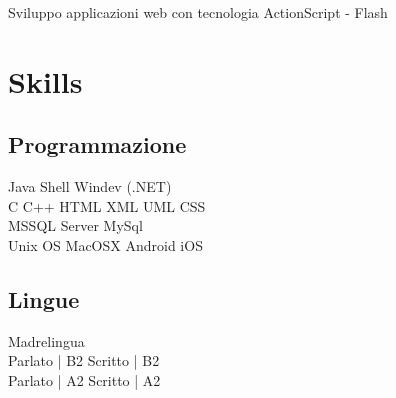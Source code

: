 \documentclass[a4paper]{deedy-resume} %
\begin{document}
\begin{minipage}[t]{0.66\textwidth}
\sectionspace %




\begin{tightitemize}
\item Sviluppo applicazioni web con tecnologia ActionScript - Flash
\end{tightitemize}

\sectionspace %



\section{Skills}

\subsection{Programmazione}

Java \textbullet{} Shell \textbullet{} Windev (.NET) \\
C \textbullet{} C++ \textbullet{} HTML \textbullet{} XML \textbullet{} UML\textbullet{} CSS\\
MSSQL Server \textbullet{} MySql \\
Unix OS \textbullet{} MacOSX \textbullet{} Android \textbullet{} iOS

\sectionspace %

\subsection{Lingue}
Madrelingua \\
Parlato | B2 \textbullet{}
Scritto | B2 \\
Parlato | A2 \textbullet{}
Scritto | A2 \\

\sectionspace %



\end{minipage}
\end{document}

